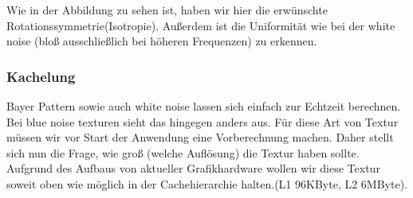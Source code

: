 Wie in der Abbildung zu sehen ist, haben wir hier die erwünschte
Rotationssymmetrie(Isotropie). Außerdem ist die Uniformität wie 
bei der white noise (bloß ausschließlich bei höheren Frequenzen)
zu erkennen. 

\subsubsection{Kachelung}
Bayer Pattern sowie auch white noise lassen sich einfach zur Echtzeit berechnen. Bei blue noise texturen 
sieht das hingegen anders aus. Für diese Art von Textur müssen wir vor Start der Anwendung eine
Vorberechnung machen. Daher stellt sich nun die Frage, wie groß (welche Auflösung) die Textur haben sollte. 
Aufgrund des Aufbaus von aktueller Grafikhardware \cite{turingarchitecture} wollen wir diese Textur
soweit oben wie möglich in der Cachehierarchie halten.(L1 96KByte, L2 6MByte).
